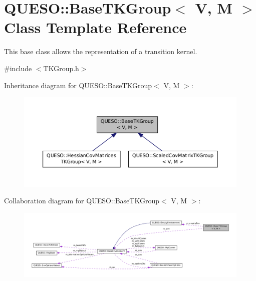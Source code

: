 \hypertarget{class_q_u_e_s_o_1_1_base_t_k_group}{\section{Q\-U\-E\-S\-O\-:\-:Base\-T\-K\-Group$<$ V, M $>$ Class Template Reference}
\label{class_q_u_e_s_o_1_1_base_t_k_group}
}


This base class allows the representation of a transition kernel.  




{\ttfamily \#include $<$T\-K\-Group.\-h$>$}



Inheritance diagram for Q\-U\-E\-S\-O\-:\-:Base\-T\-K\-Group$<$ V, M $>$\-:
\nopagebreak
\begin{figure}[H]
\begin{center}
\leavevmode
\includegraphics[width=350pt]{class_q_u_e_s_o_1_1_base_t_k_group__inherit__graph}
\end{center}
\end{figure}


Collaboration diagram for Q\-U\-E\-S\-O\-:\-:Base\-T\-K\-Group$<$ V, M $>$\-:
\nopagebreak
\begin{figure}[H]
\begin{center}
\leavevmode
\includegraphics[width=350pt]{class_q_u_e_s_o_1_1_base_t_k_group__coll__graph}
\end{center}
\end{figure}
